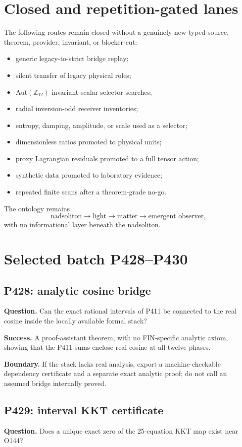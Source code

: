 \documentclass[11pt,a4paper]{article}
\begin{document}
\section{Closed and repetition-gated lanes}
The following routes remain closed without a genuinely new typed source,
theorem, provider, invariant, or blocker-cut:
\begin{itemize}
\item generic legacy-to-strict bridge replay;
\item silent transfer of legacy physical roles;
\item Aut$(\mathbb Z_{12})$-invariant scalar selector searches;
\item radial inversion-odd receiver inventories;
\item entropy, damping, amplitude, or scale used as a selector;
\item dimensionless ratios promoted to physical units;
\item proxy Lagrangian residuals promoted to a full tensor action;
\item synthetic data promoted to laboratory evidence;
\item repeated finite scans after a theorem-grade no-go.
\end{itemize}
The ontology remains
\[
\text{nadsoliton}\to\text{light}\to\text{matter}\to\text{emergent observer},
\]
with no informational layer beneath the nadsoliton.

\section{Selected batch P428--P430}
\subsection{P428: analytic cosine bridge}
\textbf{Question.} Can the exact rational intervals of P411 be connected to
the real cosine inside the locally available formal stack?

\textbf{Success.} A proof-assistant theorem, with no FIN-specific analytic
axiom, showing that the P411 sums enclose real cosine at all twelve phases.

\textbf{Boundary.} If the stack lacks real analysis, export a machine-checkable
dependency certificate and a separate exact analytic proof; do not call an
assumed bridge internally proved.

\subsection{P429: interval KKT certificate}
\textbf{Question.} Does a unique exact zero of the 25-equation KKT map exist
near O144?
\end{document}
